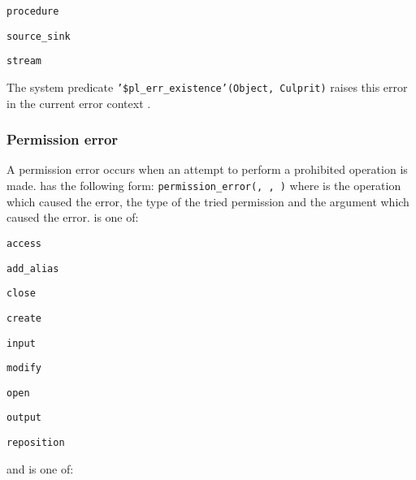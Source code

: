 \begin{ItemizeThreeCols}

\item \texttt{procedure}

\item \texttt{source\_sink}

\item \texttt{stream}

\end{ItemizeThreeCols}

The system predicate \texttt{'\$pl\_err\_existence'(Object, Culprit)} raises
this error in the current error context .

\subsubsection{Permission error}
\label{Permission-error}
A permission error occurs when an attempt to perform a prohibited operation
is made.  has the following form:
\texttt{permission\_error(, ,
)} where  is the operation which
caused the error,  the type of the tried
permission and  the argument which caused the
error.  is one of:

\begin{ItemizeThreeCols}

\item \texttt{access}

\item \texttt{add\_alias}

\item \texttt{close}

\item \texttt{create}

\item \texttt{input}

\item \texttt{modify}

\item \texttt{open}

\item \texttt{output}

\item \texttt{reposition}

\end{ItemizeThreeCols}

and  is one of:

